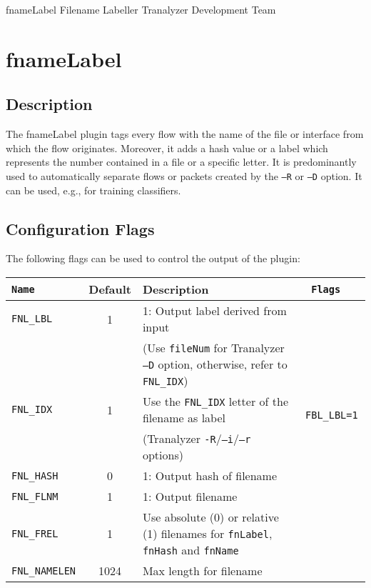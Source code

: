 \documentclass[documentation]{subfiles}
\begin{document}
\trantitle
    {fnameLabel} %
    {Filename Labeller} %
    {Tranalyzer Development Team} %

\section{fnameLabel}\label{s:fnameLabel}

\subsection{Description}
The fnameLabel plugin tags every flow with the name of the file or interface from which the flow originates.
Moreover, it adds a hash value or a label which represents the number contained in a file or a specific letter.
It is predominantly used to automatically separate flows or packets created by the {\tt --R} or {\tt --D} option.
It can be used, e.g., for training classifiers.

\subsection{Configuration Flags}
The following flags can be used to control the output of the plugin:
\begin{longtable}{>{\tt}lcl>{\tt\small}l}
    \toprule
    {\bf Name} & {\bf Default} & {\bf Description} & {\bf Flags}\\
    \midrule\endhead%
    FNL\_LBL     &    1 & 1: Output label derived from input                                                          & \\
                 &      & (Use {\tt fileNum} for Tranalyzer {\tt --D} option, otherwise, refer to {\tt FNL\_IDX})     & \\
    FNL\_IDX     &    1 & Use the {\tt FNL\_IDX} letter of the filename as label                                      & FBL\_LBL=1\\
                 &      & (Tranalyzer {\tt -R}/{\tt --i}/{\tt --r} options)                                           & \\
    FNL\_HASH    &    0 & 1: Output hash of filename                                                                  & \\
    FNL\_FLNM    &    1 & 1: Output filename                                                                          & \\
    FNL\_FREL    &    1 & Use absolute (0) or relative (1) filenames for {\tt fnLabel}, {\tt fnHash} and {\tt fnName} & \\
    FNL\_NAMELEN & 1024 & Max length for filename                                                                     & \\
    \bottomrule
\end{longtable}
\end{document}
